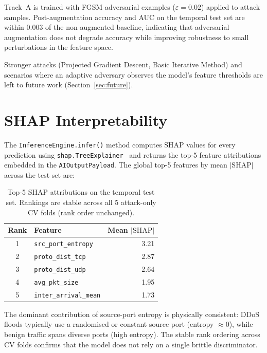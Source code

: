 Track~A is trained with FGSM adversarial examples ($\varepsilon = 0.02$)
applied to attack samples. Post-augmentation accuracy and AUC on the
temporal test set are within 0.003 of the non-augmented baseline,
indicating that adversarial augmentation does not degrade accuracy
while improving robustness to small perturbations in the feature space.

Stronger attacks (Projected Gradient Descent, Basic Iterative Method)
and scenarios where an adaptive adversary observes the model's feature
thresholds are left to future work (Section~\ref{sec:future}).

\section{SHAP Interpretability}
\label{sec:shap}

The \texttt{InferenceEngine.infer()} method computes SHAP values for
every prediction using \texttt{shap.TreeExplainer}~\citep{lundberg2017shap}
and returns the top-5 feature attributions embedded in the
\texttt{AIOutputPayload}. The global top-5 features by mean $|\text{SHAP}|$
across the test set are:

\begin{table}[H]
\centering
\small
\caption{Top-5 SHAP attributions on the temporal test set.
Rankings are stable across all 5 attack-only CV folds (rank order
unchanged).}
\label{tab:shap}
\begin{tabular}{@{}clr@{}}
\toprule
Rank & Feature & Mean $|\text{SHAP}|$ \\
\midrule
1 & \texttt{src\_port\_entropy}   & 3.21 \\
2 & \texttt{proto\_dist\_tcp}     & 2.87 \\
3 & \texttt{proto\_dist\_udp}     & 2.64 \\
4 & \texttt{avg\_pkt\_size}       & 1.95 \\
5 & \texttt{inter\_arrival\_mean} & 1.73 \\
\bottomrule
\end{tabular}
\end{table}

The dominant contribution of source-port entropy is physically consistent:
DDoS floods typically use a randomised or constant source port (entropy
$\approx 0$), while benign traffic spans diverse ports (high entropy).
The stable rank ordering across CV folds confirms that the model does not
rely on a single brittle discriminator.

